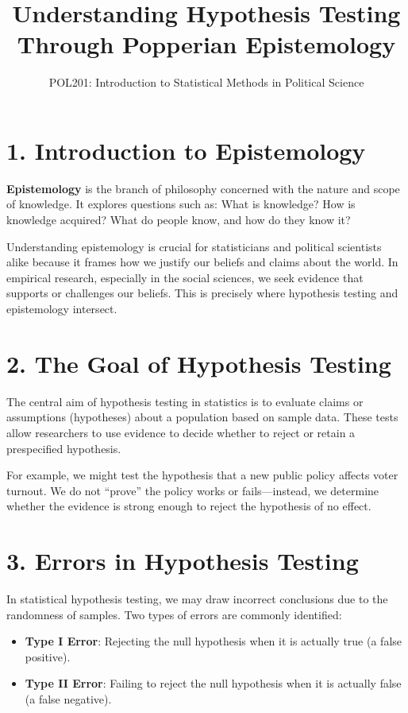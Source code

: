 \documentclass[12pt]{article}
\title{Understanding Hypothesis Testing Through Popperian Epistemology}
\author{POL201: Introduction to Statistical Methods in Political Science}
\date{}
\begin{document}
\maketitle

\section*{1. Introduction to Epistemology}
\textbf{Epistemology} is the branch of philosophy concerned with the nature and scope of knowledge. It explores questions such as: What is knowledge? How is knowledge acquired? What do people know, and how do they know it?

Understanding epistemology is crucial for statisticians and political scientists alike because it frames how we justify our beliefs and claims about the world. In empirical research, especially in the social sciences, we seek evidence that supports or challenges our beliefs. This is precisely where hypothesis testing and epistemology intersect.

\section*{2. The Goal of Hypothesis Testing}
The central aim of hypothesis testing in statistics is to evaluate claims or assumptions (hypotheses) about a population based on sample data. These tests allow researchers to use evidence to decide whether to reject or retain a prespecified hypothesis.

For example, we might test the hypothesis that a new public policy affects voter turnout. We do not ``prove'' the policy works or fails—instead, we determine whether the evidence is strong enough to reject the hypothesis of no effect.

\section*{3. Errors in Hypothesis Testing}
In statistical hypothesis testing, we may draw incorrect conclusions due to the randomness of samples. Two types of errors are commonly identified:

\begin{itemize}
  \item \textbf{Type I Error}: Rejecting the null hypothesis when it is actually true (a false positive).
  \item \textbf{Type II Error}: Failing to reject the null hypothesis when it is actually false (a false negative).
\end{itemize}
\end{document}
